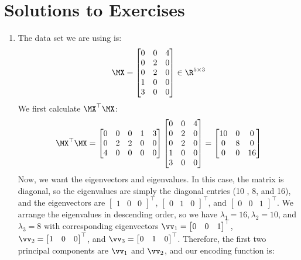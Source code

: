 \section{Solutions to Exercises}
\begin{enumerate}
    \item The data set we are using is:
    $$\MX = \begin{bmatrix} 0 & 0 & 4\\ 0 & 2 & 0\\ 0 & 2 & 0\\ 1 & 0 & 0\\ 3 & 0 & 0 \end{bmatrix} \in \R^{5 \times 3}$$
    We first calculate $\MX^\top\MX$:
    $$\MX^\top\MX = \begin{bmatrix} 0 & 0 & 0 & 1 & 3\\ 0 & 2 & 2 & 0 & 0\\ 4 & 0 & 0 & 0 & 0 \end{bmatrix} \begin{bmatrix} 0 & 0 & 4\\ 0 & 2 & 0\\ 0 & 2 & 0\\ 1 & 0 & 0\\ 3 & 0 & 0 \end{bmatrix} = \begin{bmatrix} 10 & 0 & 0\\ 0 & 8 & 0\\ 0 & 0 & 16 \end{bmatrix}$$
    Now, we want the eigenvectors and eigenvalues.  In this case, the matrix is diagonal, so the eigenvalues are simply the diagonal entries (10 , 8, and 16), and the eigenvectors are $\begin{bmatrix} 1 & 0 & 0 \end{bmatrix}^\top$, $\begin{bmatrix} 0 & 1 & 0 \end{bmatrix}^\top$, and $\begin{bmatrix} 0 & 0 & 1 \end{bmatrix}^\top$.  We arrange the eigenvalues in descending order, so we have $\lambda_1 = 16, \lambda_2 = 10$, and $\lambda_3 = 8$ with corresponding eigenvectors $\vv_1 = \begin{bmatrix} 0 & 0 & 1 \end{bmatrix}^\top$, $\vv_2 = \begin{bmatrix} 1 & 0 & 0 \end{bmatrix}^\top$, and $\vv_3 = \begin{bmatrix} 0 & 1 & 0 \end{bmatrix}^\top$.  Therefore, the first two principal components are $\vv_1$ and $\vv_2$, and our encoding function is:

\end{enumerate}
